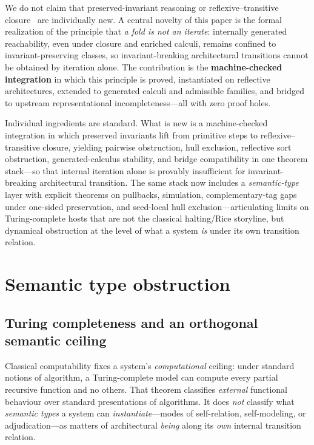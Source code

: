 \documentclass[11pt]{article}
\theoremstyle{plain}
\theoremstyle{definition}
\theoremstyle{remark}
\begin{document}
We do not claim that preserved-invariant reasoning or reflexive--transitive
closure~\cite{barendregt1984,mathlib} are individually new.  A central novelty of this
paper is the formal realization of the principle that \emph{a fold is not an iterate}:
internally generated reachability, even under closure and enriched calculi, remains
confined to invariant-preserving classes, so invariant-breaking architectural transitions
cannot be obtained by iteration alone.  The contribution is the
\textbf{machine-checked integration} in which this principle is proved, instantiated on
reflective architectures, extended to generated calculi and admissible families, and
bridged to upstream representational incompleteness---all with zero proof holes.

\begin{keybox}[title={The novelty is the formal realization}]
Individual ingredients are standard.  What is new is a machine-checked integration in
which preserved invariants lift from primitive steps to reflexive--transitive closure,
yielding pairwise obstruction, hull exclusion, reflective sort obstruction,
generated-calculus stability, and bridge compatibility in one theorem stack---so that
internal iteration alone is provably insufficient for invariant-breaking architectural
transition.  The same stack now includes a \emph{semantic-type} layer with explicit
theorems on pullbacks, simulation, complementary-tag gaps under one-sided preservation,
and seed-local hull exclusion---articulating limits on Turing-complete hosts that are not
the classical halting/Rice storyline, but dynamical obstruction at the level of what a
system \emph{is} under its own transition relation.
\end{keybox}

\section{Semantic type obstruction}\label{sec:semantic-type}

\subsection*{Turing completeness and an orthogonal semantic ceiling}

Classical computability fixes a system's \emph{computational} ceiling: under standard
notions of algorithm, a Turing-complete model can compute every partial recursive function
and no others.  That theorem classifies \emph{external} functional behaviour over standard
presentations of algorithms.  It does \emph{not} classify what \emph{semantic types} a
system can \emph{instantiate}---modes of self-relation, self-modeling, or adjudication---as
matters of architectural \emph{being} along its \emph{own} internal transition relation.
\end{document}
